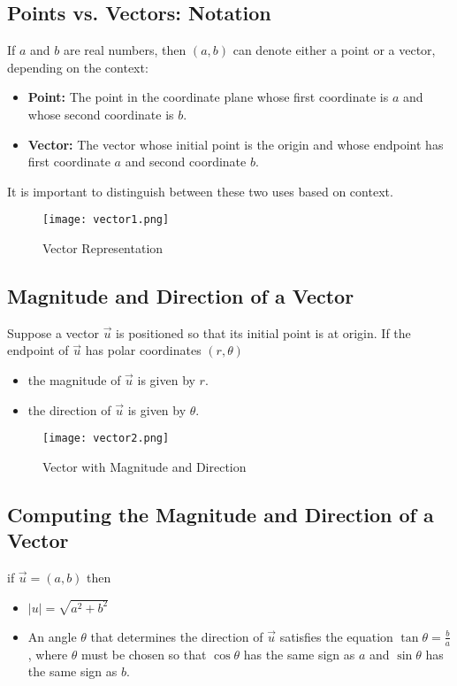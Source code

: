 \subsection{Points vs. Vectors: Notation}
If \(a\) and \(b\) are real numbers, then \((a, b)\) can denote either a point or a vector, depending on the context:
\begin{itemize}
    \item \textbf{Point:} The point in the coordinate plane whose first coordinate is \(a\) and whose second coordinate is \(b\).
    \item \textbf{Vector:} The vector whose initial point is the origin and whose endpoint has first coordinate \(a\) and second coordinate \(b\).
\end{itemize}
It is important to distinguish between these two uses based on context.
\begin{figure}
    \centering
    \texttt{[image: vector1.png]}
    \caption{Vector Representation}
    \label{fig:vector_representation}
\end{figure}

\subsection{Magnitude and Direction of a Vector}
Suppose a vector \(\vec{u}\) is positioned so that its initial point is at origin. If the endpoint of \(\vec{u}\) has polar coordinates \((r, \theta)\)
\begin{itemize}
    \item the magnitude of \(\vec{u}\) is given by \(r\).
    \item the direction of \(\vec{u}\) is given by \(\theta\).
\end{itemize}
\begin{figure}
    \centering
    \texttt{[image: vector2.png]}
    \caption{Vector with Magnitude and Direction}
    \label{fig:vector_magnitude_direction}
\end{figure}

\subsection{Computing the Magnitude and Direction of a Vector}
if \(\vec u = (a,b)\) then
\begin{itemize}
    \item \(|u| = \sqrt{a^2 + b^2}\)
    \item An angle \(\theta\) that determines the direction of \(\vec{u}\) satisfies the equation \(\tan \theta = \frac{b}{a}\), where \(\theta\) must be chosen so that \(\cos \theta\) has the same sign as \(a\) and \(\sin \theta\) has the same sign as \(b\).
\end{itemize}

